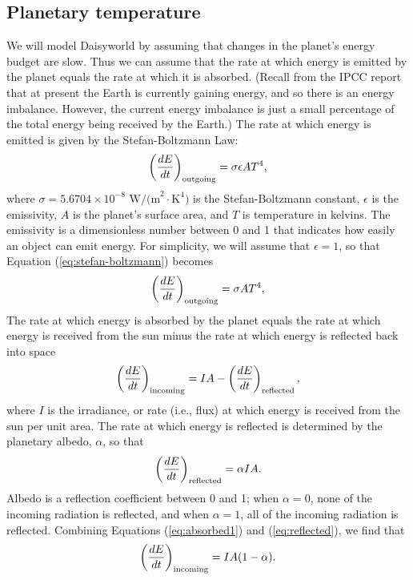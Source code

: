 \documentclass[11pt,letterpaper]{article}
\begin{document}
\subsection{Planetary temperature}
We will model Daisyworld by assuming that changes in the planet's energy budget are slow. Thus we can assume that the rate at which energy is emitted by the planet equals the rate at which it is absorbed. (Recall from the IPCC report that at present the Earth is currently gaining energy, and so there is an energy imbalance. However, the current energy imbalance is just a small percentage of the total energy being received by the Earth.) The rate at which energy is emitted is given by the Stefan-Boltzmann Law:
\begin{equation}
\left(\frac{dE}{dt}\right)_{\rm outgoing}=\sigma\epsilon AT^4,
\label{eq:stefan-boltzmann}
\end{equation}
where $\sigma=5.6704\times{10}^{-8}\mbox{ W/(m}^2\cdot\mbox{K}^4\mbox{)}$ is the Stefan-Boltzmann constant, $\epsilon$ is the emissivity, $A$ is the planet's surface area, and $T$ is temperature in kelvins. The emissivity is a dimensionless number between 0 and 1 that indicates how easily an object can emit energy. For simplicity, we will assume that $\epsilon=1$, so that Equation (\ref{eq:stefan-boltzmann}) becomes
\begin{equation}
\left(\frac{dE}{dt}\right)_{\rm outgoing}=\sigma AT^4,
\label{eq:stefan-boltzmann2}
\end{equation}
The rate at which energy is absorbed by the planet equals the rate at which energy is received from the sun minus the rate at which energy is reflected back into space
\begin{equation}
\left(\frac{dE}{dt}\right)_{\rm incoming}=IA-\left(\frac{dE}{dt}\right)_{\rm reflected},
\label{eq:absorbed1}
\end{equation}
\noindent where $I$ is the irradiance, or rate (i.e., flux) at which energy is received from the sun per unit area. The rate at which energy is reflected is determined by the planetary albedo, $\alpha$, so that
\begin{equation}
\left(\frac{dE}{dt}\right)_{\rm reflected}=\alpha{IA}.
\label{eq:reflected}
\end{equation} 
\noindent Albedo is a reflection coefficient between 0 and 1; when $\alpha=0$, none of the incoming radiation is reflected, and when $\alpha=1$, all of the incoming radiation is reflected. Combining Equations (\ref{eq:absorbed1}) and (\ref{eq:reflected}), we find that
\begin{equation}
\left(\frac{dE}{dt}\right)_{\rm incoming}=IA(1-\alpha).
\label{eq:absorbed2}
\end{equation}
\end{document}
